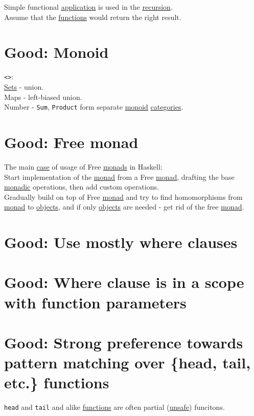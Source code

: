 \documentclass[a4paper,14pt,oneside]{book}
\begin{document}
{Simple functional \hyperref[org623a42d]{application} is used in the \hyperref[orgffd6cda]{recursion}.\\
Assume that the \hyperref[orgf33f5fb]{functions} would return the right result.\\


\chapter{\label{org97a8092}Good: Monoid}
\label{sec:orga50dc4f}
\texttt{<>}:\\
\hyperref[org732f054]{Sets} - union.\\
Maps - left-biased union.\\
Number - \texttt{Sum}, \texttt{Product} form separate \hyperref[orgcf84af2]{monoid} \hyperref[org418901f]{categories}.\\

\chapter{\label{org528fa7b}Good: Free monad}
\label{sec:org212d8e7}
The main \hyperref[org6609611]{case} of usage of Free \hyperref[org7e5e6f7]{monads} in Haskell:\\

Start implementation of the \hyperref[org90c21ab]{monad} from a Free \hyperref[org90c21ab]{monad}, drafting the base \hyperref[orgbea0cab]{monadic} operations, then add custom operations.\\

Gradually build on top of Free \hyperref[org90c21ab]{monad} and try to find homomorphisms from \hyperref[org90c21ab]{monad} to \hyperref[org7c09bf4]{objects}, and if only \hyperref[org7c09bf4]{objects} are needed - get rid of the free \hyperref[org90c21ab]{monad}.\\

\chapter{\label{orgd3a3b6b}Good: Use mostly where clauses}
\label{sec:orgf61175b}

\chapter{\label{org2bf87a3}Good: Where clause is in a scope with function parameters}
\label{sec:org3858c8d}

\chapter{\label{org2c74fef}Good: Strong preference towards pattern matching over \{head, tail, etc.\} functions}
\label{sec:orgd0fbe75}
\texttt{head} and \texttt{tail} and alike \hyperref[orgf33f5fb]{functions} are often partial (\hyperref[org92df57b]{unsafe}) funcitons.\\

}
\end{document}
